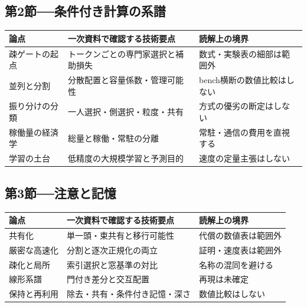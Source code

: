 \documentclass[lualatex,a4paper,10pt]{jlreq}
\begin{document}
\subsection*{第2節──条件付き計算の系譜}
\begin{tabularx}{\textwidth}{@{}>{\raggedright\arraybackslash}p{}>{\raggedright\arraybackslash}p{}>{\raggedright\arraybackslash}X@{}}
\toprule
論点 & 一次資料で確認する技術要点 & 読解上の境界 \\
\midrule
疎ゲートの起点 & トークンごとの専門家選択と補助損失 & 数式・実験表の細部は範囲外 \\
並列と分割 & 分散配置と容量係数・管理可能性 &  bench横断の数値比較はしない \\
振り分けの分類 & 一人選択・側選択・粒度・共有 & 方式の優劣の断定はしない \\
稼働量の経済学 & 総量と稼働・常駐の分離 & 常駐・通信の費用を直視する \\
学習の土台 & 低精度の大規模学習と予測目的 & 速度の定量主張はしない \\
\bottomrule
\end{tabularx}
\autocite{shazeer2017,gshard,switcht,deepseekmoe,deepseekv2,deepseekv3}

\subsection*{第3節──注意と記憶}
\begin{tabularx}{\textwidth}{@{}>{\raggedright\arraybackslash}p{}>{\raggedright\arraybackslash}p{}>{\raggedright\arraybackslash}X@{}}
\toprule
論点 & 一次資料で確認する技術要点 & 読解上の境界 \\
\midrule
共有化 & 単一頭・束共有と移行可能性 & 代償の数値表は範囲外 \\
厳密な高速化 & 分割と逐次正規化の両立 & 証明・速度表は範囲外 \\
疎化と局所 & 索引選択と窓基準の対比 & 名称の混同を避ける \\
線形系譜 & 門付き差分と交互配置 & 再現は未確定 \\
保持と再利用 & 除去・共有・条件付き記憶・深さ & 数値比較はしない \\
\bottomrule
\end{tabularx}
\autocite{mqa,gqa,flashattn,nsa,kimilinear,engram}
\normalsize

\end{document}
